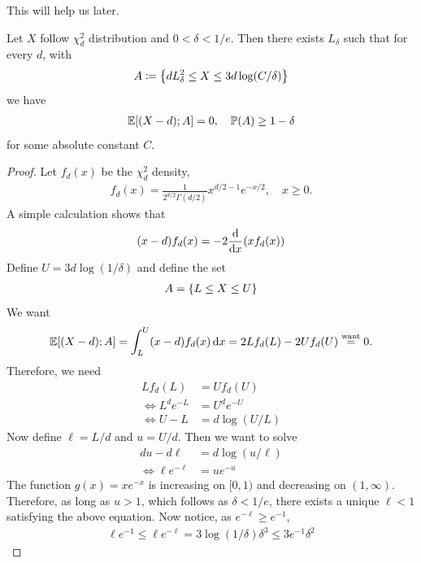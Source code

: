 This will help us later.
\begin{lemma}
    \label{lem:bounded-p-norm}
    Let $X$ follow $\chi^2_d$ distribution and $0 < \delta < 1/e$. Then there exists $L_{\delta}$ such that for every $d$, with
    \begin{align*}
        A \coloneqq \left\{dL_{\delta}^2 \leq X \leq 3d\log(C/\delta)\right\}
    \end{align*}
    we have
    \begin{align*}
        \mathbb{E}\qty[(X-d) ; A] = 0, \quad \mathbb{P}\qty(A) \geq 1-\delta
    \end{align*}
    for some absolute constant $C$.
\end{lemma}
\begin{proof}
    Let $f_d(x)$ be the $\chi^2_d$ density,
    \begin{align*}
        f_d(x) = \frac{1}{2^{d/2} \Gamma(d/2)} x^{d/2 -1}e^{-x/2}, \quad x \geq 0.
    \end{align*}
    A simple calculation shows that
    \begin{align*}
        (x-d)f_d(x) = -2\dv{x} (xf_d(x))
    \end{align*}
    Define $U = 3d \log(1/\delta)$ and define the set
    \begin{align*}
        A = \left\{L \leq X \leq U\right\}
    \end{align*}
    We want
    \begin{align*}
        \mathbb{E}\qty[(X-d) ; A] = \int_L^U (x-d)f_d(x)\,\dd x = 2Lf_d(L) - 2Uf_d(U) \overset{\mathrm{want}}{=} 0.
    \end{align*}
    Therefore, we need 
    \begin{align*}
        Lf_d(L) &= Uf_d(U) \\ \iff L^d e^{-L} &= U^d e^{-U} \\
        \iff U - L &= d\log(U/L)
    \end{align*}
    Now define $\ell = L/d$ and $u = U/d$. Then we want to solve
    \begin{align*}
        du - d\ell &= d\log(u/\ell) \\
        \iff \ell e^{-\ell} &= u e^{-u}
    \end{align*}
    The function $g(x) = xe^{-x}$ is increasing on $[0,1)$ and decreasing on $(1,\infty)$. Therefore, as long as $u > 1$, which follows as $\delta < 1/e$, there exists a unique $\ell < 1$ satisfying the above equation. Now notice, as $e^{-\ell} \geq e^{-1}$,
    \begin{align*}
        \ell e^{-1} \leq \ell e^{-\ell} = 3\log(1/\delta) \delta^3 \leq 3e^{-1} \delta^2

\end{align*}
\end{proof}

